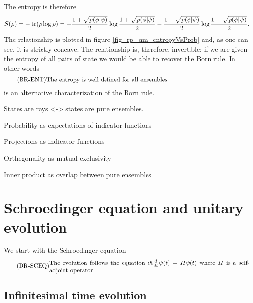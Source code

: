 The entropy is therefore
\begin{equation}
	\begin{aligned}
		S(\rho) = - \operatorname{tr}(\rho \log \rho) = - \frac{1+\sqrt{p(\phi|\psi)}}{2} \log \frac{1+\sqrt{p(\phi|\psi)}}{2} - \frac{1-\sqrt{p(\phi|\psi)}}{2} \log \frac{1-\sqrt{p(\phi|\psi)}}{2}.
	\end{aligned}
\end{equation}
The relationship is plotted in figure \ref{fig_rp_qm_entropyVsProb} and, as one can see, it is strictly concave. The relationship is, therefore, invertible: if we are given the entropy of all pairs of state we would be able to recover the Born rule. In other words
\begin{equation}\label{rp-qm-br-condEntropy}
	\tag{BR-ENT}
	\eqtext{The entropy is well defined for all ensembles} 
\end{equation}
is an alternative characterization of the Born rule.


States are rays <-> states are pure ensembles.

Probability as expectations of indicator functions

Projections as indicator functions

Orthogonality as mutual exclusivity

Inner product as overlap between pure ensembles

\section{Schroedinger equation and unitary evolution}

We start with the Schroedinger equation
\begin{equation}\label{rp-qm-uev-condSchroedingerEq}
	\tag{DR-SCEQ}
	\eqtext{The evolution follows the equation $\imath \hbar \frac{d}{dt} \psi(t) = H \psi(t)$ where $H$ is a self-adjoint operator}
\end{equation}

\subsection{Infinitesimal time evolution}

